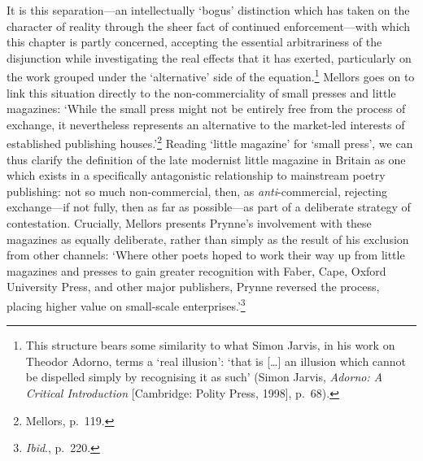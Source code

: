 \documentclass[]{article}
\begin{document}
\noindent It is this separation---an intellectually `bogus' distinction
which has taken on the character of reality through the sheer fact of
continued enforcement---with which this chapter is partly concerned,
accepting the essential arbitrariness of the disjunction while
investigating the real effects that it has exerted, particularly on the
work grouped under the `alternative' side of the equation.\footnote{This
  structure bears some similarity to what Simon Jarvis, in his work on
  Theodor Adorno, terms a `real illusion': `that is {[}\ldots{}{]} an
  illusion which cannot be dispelled simply by recognising it as such'
  (Simon Jarvis, \emph{Adorno: A Critical Introduction} {[}Cambridge:
  Polity Press, 1998{]}, p.~68).} Mellors goes on to link this situation
directly to the non-commerciality of small presses and little magazines:
`While the small press might not be entirely free from the process of
exchange, it nevertheless represents an alternative to the market-led
interests of established publishing houses.'\footnote{Mellors, p.~119.}
Reading `little magazine' for `small press', we can thus clarify the
definition of the late modernist little magazine in Britain as one which
exists in a specifically antagonistic relationship to mainstream poetry
publishing: not so much non-commercial, then, as \emph{anti}-commercial,
rejecting exchange---if not fully, then as far as possible---as part of
a deliberate strategy of contestation. Crucially, Mellors presents
Prynne's involvement with these magazines as equally deliberate, rather
than simply as the result of his exclusion from other channels: `Where
other poets hoped to work their way up from little magazines and presses
to gain greater recognition with Faber, Cape, Oxford University Press,
and other major publishers, Prynne reversed the process, placing higher
value on small-scale enterprises.'\footnote{\emph{Ibid}., p.~220.}
\end{document}
